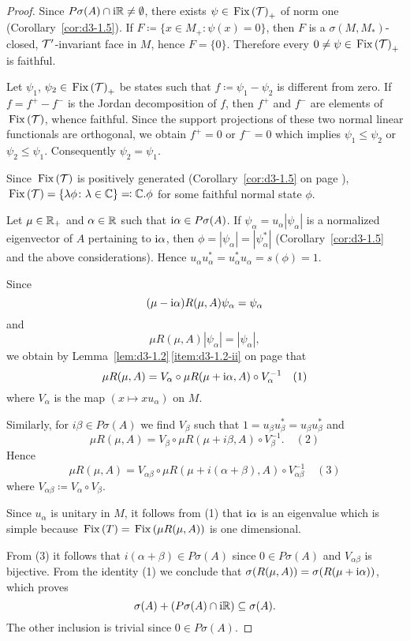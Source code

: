 \begin{proof}
Since $P\sigma(A) \cap \mathrm{i}\mathbb{R} \neq \emptyset$, there exists $\psi \in \mathop{}\mathrm{Fix}\left(\mathcal{T}\right)_{+}$ of norm one (Corollary~\ref{cor:d3-1.5}).
If $F \coloneqq \{x \in M_{+} \colon \psi(x) = 0\}$, then $F$ is a $\sigma(M,M_{*})$-closed, $\mathcal{T}'$-invariant face in $M$, hence $F = \{0\}$.
Therefore every $0 \neq \psi \in \mathop{}\mathrm{Fix}\left(\mathcal{T}\right)_{+}$ is faithful.

Let $\psi_{1}$, $\psi_{2} \in \mathop{}\mathrm{Fix}\left(\mathcal{T}\right)_{+}$ be states such that $f \coloneqq \psi_{1} - \psi_{2}$ is different from zero. 
If $f = f^{+} - f^{-}$ is the Jordan decomposition of $f$, then $f^{+}$ and $f^{-}$ are elements of $\mathop{}\mathrm{Fix}\left(\mathcal{T}\right)$, whence faithful.
Since the support projections of these two normal linear functionals are orthogonal, we obtain $f^{+} = 0$ or $f^{-} = 0$ which implies $\psi_{1} \leq \psi_{2}$ or $\psi_{2} \leq \psi_{1}$.
Consequently $\psi_{2} = \psi_{1}$.

Since $\mathop{}\mathrm{Fix}\left(\mathcal{T}\right)$ is positively generated (Corollary~\ref{cor:d3-1.5} on page \pageref{cor:d3-1.5}), 
$\mathop{}\mathrm{Fix}\left(\mathcal{T}\right) = \{ \lambda \phi \colon \lambda \in \mathbb{C} \} \eqcolon \mathbb{C}.\phi$ for some faithful normal state $\phi$.

Let $\mu \in \mathbb{R}_{+}$ and $\alpha \in \mathbb{R}$ such that $\mathrm{i}\alpha \in P\sigma(A)$.
If $\psi_{\alpha} = u_{\alpha}|\psi_{\alpha}|$ is a normalized eigenvector of $A$ pertaining to $\mathrm{i}\alpha$, then $\phi = |\psi_{\alpha}| = |\psi_{\alpha}^{*}|$ (Corollary~\ref{cor:d3-1.5} and the above considerations).
Hence $u_{\alpha}u_{\alpha}^{*} = u_{\alpha}^{*}u_{\alpha} = s(\phi) = 1$.

Since
\[
(\mu - \mathrm{i}\alpha)R(\mu,A)\psi_{\alpha} = \psi_{\alpha}
\]
and
\[
\mu R(\mu,A)|\psi_{\alpha}| = |\psi_{\alpha}| ,
\]
we obtain by Lemma~\ref{lem:d3-1.2}\,\ref{item:d3-1.2-ii} on page \pageref{lem:d3-1.2} that
\[
\mu R(\mu,A) = V_{\alpha} \circ \mu R(\mu+\mathrm{i}\alpha,A) \circ V_{\alpha}^{-1} \quad (1)
\]
where $V_{\alpha}$ is the map $(x \mapsto xu_{\alpha})$ on $M$.

Similarly, for $i\beta \in P\sigma(A)$ we find $V_{\beta}$ such that $1 = u_{\beta}u_{\beta}^{*} = u_{\beta}u_{\beta}^{*}$ and
\[
\mu R(\mu,A) = V_{\beta} \circ \mu R(\mu+i\beta,A) \circ V_{\beta}^{-1}. \quad (2) 
\]
Hence
\[
\mu R(\mu,A) = V_{\alpha\beta} \circ \mu R(\mu+i(\alpha+\beta),A) \circ V_{\alpha\beta}^{-1} \quad (3)
\]
where $V_{\alpha\beta} \coloneqq V_{\alpha} \circ V_{\beta}$.

Since $u_{\alpha}$ is unitary in $M$, it follows from (1) that $\mathrm{i}\alpha$ is an eigenvalue which is simple because $\mathop{}\mathrm{Fix}\left(T\right) = \mathop{}\mathrm{Fix}\left(\mu R(\mu,A)\right)$ is one dimensional.

From (3) it follows that $i(\alpha+\beta) \in P\sigma(A)$ since $0 \in P\sigma(A)$ and $V_{\alpha\beta}$ is bijective.
From the identity (1) we conclude that $\sigma(R(\mu,A)) = \sigma(R(\mu+\mathrm{i}\alpha))$, which proves
\[
\sigma(A) + (P\sigma(A) \cap \mathrm{i}\mathbb{R}) \subseteq \sigma(A).
\]
The other inclusion is trivial since $0 \in P\sigma(A)$.
\end{proof}
